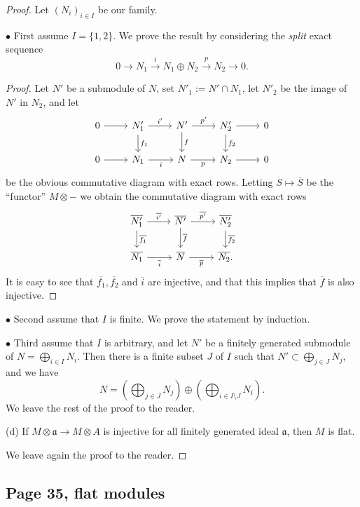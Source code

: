 \documentclass[parskip=half,fontsize=12pt]{scrartcl}%
\newcommand{\mf}{\mathfrak}
\newcommand{\aaa}{\mf a}
\newcommand{\bu}{\bullet}
\begin{document}
\begin{proof} 
Let $(N_i)_{i\in I}$ be our family. 

$\bu$ First assume $I=\{1,2\}$. We prove the result by considering the \emph{split} exact sequence 
$$
0\to N_1\xrightarrow i N_1\oplus N_2\xrightarrow pN_2\to0.
$$ 
\begin{proof}
Let $N'$ be a submodule of $N$, set $N'_1:=N'\cap N_1$, let $N'_2$ be the image of $N'$ in $N_2$, and let 
$$
\begin{tikzcd}
0\ar[r]&N'_1\ar[d,"f_1"]\ar[r,"i'"]&N'\ar[d,"f"]\ar[r,"p'"]&N'_2\ar[d,"f_2"]\ar[r]&0\\ 
0\ar[r]&N_1\ar[r,"i"']&N\ar[r,"p"']&N_2\ar[r]&0
\end{tikzcd}
$$  
be the obvious commutative diagram with exact rows. Letting $S\mapsto\overline S$ be the ``functor'' $M\otimes-$ we obtain the commutative diagram with exact rows
$$
\begin{tikzcd}
\overline{N'_1}\ar[d,"\overline{f_1}"]\ar[r,"\overline{i'}"]&\overline{N'}\ar[d,"\overline f"]\ar[r,"\overline{p'}"]& \overline{N'_2}\ar[d,"\overline{f_2}"]\\ 
\overline{N_1}\ar[r,"\overline i"']&\overline N\ar[r,"\overline p"']& \overline{N_2}.
\end{tikzcd}
$$ 
It is easy to see that $\overline{f_1},\overline{f_2}$ and $\overline i$ are injective, and that this implies that $\overline f$ is also injective.
\end{proof}

$\bu$ Second assume that $I$ is finite. We prove the statement by induction.

$\bu$ Third assume that $I$ is arbitrary, and let $N'$ be a finitely generated submodule of $N=\bigoplus_{i\in I}N_i$. Then there is a finite subset $J$ of $I$ such that $N'\subset\bigoplus_{j\in J}N_j$, and we have 
$$
N=\left(\bigoplus_{j\in J}N_j\right)\oplus\left(\bigoplus_{i\in I\setminus J}N_i\right). 
$$ 
We leave the rest of the proof to the reader.

(d) If $M\otimes\aaa\to M\otimes A$ is injective for all finitely generated ideal $\aaa$, then $M$ is flat.

We leave again the proof to the reader. 
\end{proof}

\subsection{Page 35, flat modules}%
\end{document}
